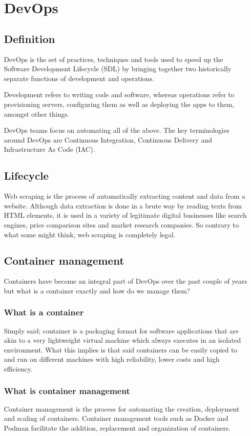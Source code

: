 \section{DevOps}
\subsection{Definition}
DevOps is the set of practices, techniques and tools used to speed up the Software Development Lifecycle (SDL) by bringing together two historically separate functions of development and operations. 

\medskip
Development refers to writing code and software, whereas operations refer to provisioning servers, configuring them as well as deploying the apps to them, amongst other things.

\medskip
DevOps teams focus on automating all of the above. The key terminologies around DevOps are Continuous Integration, Continuous Delivery and Infrastructure As Code (IAC).
\subsection{Lifecycle}
Web scraping is the process of automatically extracting content and data from a website. Although data extraction is done in a brute way by reading texts from HTML elements, it is used in a variety of legitimate digital businesses like search engines, price comparison sites and market research companies. So contrary to what some might think, web scraping is completely legal.
\subsection{Container management}
Containers have become an integral part of DevOps over the past couple of years but what is a container exactly and how do we manage them? 
\subsubsection*{What is a container}
Simply said; container is a packaging format for software applications that are akin to a very lightweight virtual machine which always executes in an isolated environment. What this implies is that said containers can be easily copied to and run on different machines with high reliability, lower costs and high efficiency.
\subsubsection*{What is container management}
Container management is the process for automating the creation, deployment and scaling of containers. Container management tools such as Docker and Podman facilitate the addition, replacement and organization of containers.

